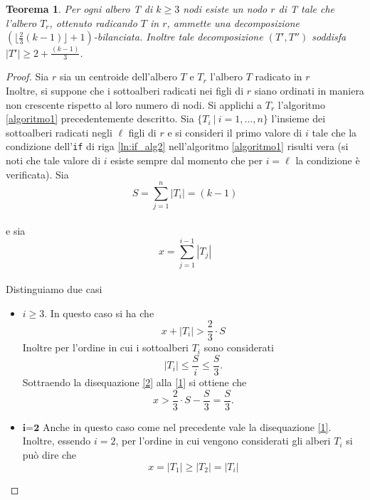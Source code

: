 \newtheorem{teorema1}[definizione]{Teorema}
\begin{teorema1}
	\label{teorema1 cap3 sez1}
Per ogni albero T di $k \ge 3$ nodi esiste un nodo $r$ di T  tale che l'albero $T_r$, ottenuto radicando $T$ in $r$, ammette una decomposizione $ (\lfloor \frac{2}{3}(k-1) \rfloor + 1)$-bilanciata. Inoltre tale decomposizione $ (T',T'')$ soddisfa $ |T'| \ge 2+\frac{(k-1)}{3} $.
\end{teorema1}
\begin{proof}
	Sia $r$ sia un centroide dell'albero $ T $ e $T_r$ l'albero $ T $ radicato in $ r $ \\  	Inoltre, si suppone che i sottoalberi radicati nei figli di $r$ siano ordinati in maniera non crescente rispetto al loro numero di nodi. 
	Si applichi a $ T_r $ l'algoritmo \ref{algoritmo1} precedentemente descritto. Sia $ \{T_i \ | \  i=1,\dots,n\} $ l'insieme dei sottoalberi radicati negli $\ell$ figli di $ r $ e si consideri il primo valore di $ i $ tale che la condizione dell'\texttt{if} di riga \ref{ln:if_alg2} nell'algoritmo \ref{algoritmo1} risulti vera (si noti che tale valore di $ i $ esiste sempre dal momento che per $ i = \ell $ la condizione \`e verificata).
	Sia 
	\[ S = \sum_{j=1}^{n}{|T_i|} = (k-1 ) \]\\
	e sia
	\[ x = \sum_{j=1}^{i-1}{|T_j|} \]\\
	Distinguiamo due casi
	\begin{itemize}
	\item $i \ge 3$. In questo caso si ha che
	\begin{equation}\label{1}
		x+|T_i| > \frac{2}{3}\cdot S
	\end{equation}
	Inoltre per l'ordine in cui i sottoalberi $ T_i $ sono considerati
	\begin{equation}\label{2}
	|T_i| \le \frac{S}{i} \le \frac{S}{3}	.
	\end{equation}
	Sottraendo la disequazione \eqref{2} alla \eqref{1} si ottiene che 
	\begin{equation}\label{3}
	x > \frac{2}{3}\cdot S - \frac{S}{3} = \frac{S}{3}.
	\end{equation}
 	\item $ \textbf{i=2} $ Anche in questo caso come nel precedente vale la disequazione \eqref{1}.\\
 	Inoltre, essendo $ i = 2 $, per l'ordine in cui vengono considerati gli alberi $T_i$ si pu\`o dire che
 	\begin{equation}\label{4}
 	x = |T_1| \ge |T_2| = |T_i|
 	\end{equation}

\end{itemize}
\end{proof}
